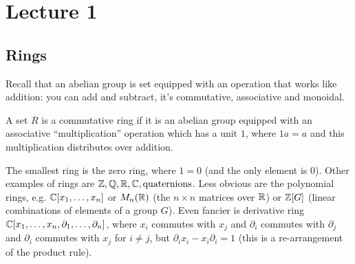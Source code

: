 \section{Lecture 1}

\subsection{Rings}
Recall that an abelian group is set equipped with an operation that works like addition: you can add and subtract, it's commutative,
associative and monoidal.
\begin{definition}
    A set $R$ is a commutative ring if it is an abelian group equipped with an associative ``multiplication'' operation which has a unit $1$, where $1a = a$
    and this multiplication distributes over addition.
\end{definition}
The smallest ring is the zero ring, where $1 = 0$ (and the only element is $0$). Other examples of rings are $\operatorname{\mathbb{Z}}, \operatorname{\mathbb{Q}}, \operatorname{\mathbb{R}}, \operatorname{\mathbb{C}}, \text{quaternions}$.
Less obvious are
the polynomial rings, e.g. $\operatorname{\mathbb{C}}[x_1, \dots, x_n]$ or $M_n(\operatorname{\mathbb{R}})$ (the $n \times n$ matrices over $\operatorname{\mathbb{R}}$) or $\operatorname{\mathbb{Z}}[G]$ (linear combinations of elements of a group $G$).
Even fancier is derivative ring $\operatorname{\mathbb{C}}[x_1, \dots, x_n, \partial_1, \dots, \partial_n]$, where $x_i$ commutes with $x_j$ and $\partial_i$ commutes with
$\partial_j$ and $\partial_i$ commutes with $x_j$ for $i \neq j$, but $\partial_i x_i - x_i \partial_i = 1$ (this is a re-arrangement of the product rule).

